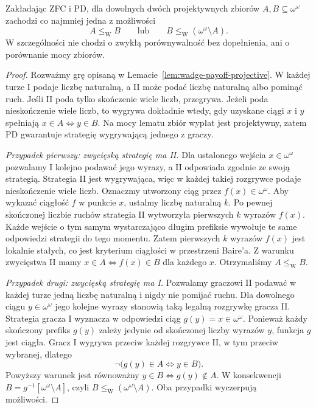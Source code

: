 \begin{twierdzenie}
\label{thm:pd-projective-wadge}
Zakładając ZFC i PD, dla dowolnych dwóch
projektywnych zbiorów $A,B\subseteq\omega^\omega$
zachodzi co najmniej jedna z możliwości
\[
 A\leq_{\mathrm W}B
 \qquad\text{lub}\qquad
 B\leq_{\mathrm W}(\omega^\omega\setminus A).
\]
W szczególności nie chodzi o zwykłą porównywalność
bez dopełnienia, ani o porównanie mocy zbiorów.
\end{twierdzenie}
\begin{proof}
Rozważmy grę opisaną w
Lemacie~\ref{lem:wadge-payoff-projective}.
W każdej turze I podaje liczbę naturalną, a II
może podać liczbę naturalną albo pominąć ruch.
Jeśli II poda tylko skończenie wiele liczb,
przegrywa. Jeżeli poda nieskończenie wiele liczb,
to wygrywa dokładnie wtedy, gdy uzyskane ciągi
$x$ i $y$ spełniają $x\in A\iff y\in B$.
Na mocy lematu zbiór wypłat jest projektywny,
zatem PD gwarantuje strategię wygrywającą jednego
z graczy.

\emph{Przypadek pierwszy: zwycięską strategię ma II.}
Dla ustalonego wejścia $x\in\omega^\omega$
pozwalamy I kolejno podawać jego wyrazy,
a II odpowiada zgodnie ze swoją strategią.
Strategia II jest wygrywająca, więc w każdej takiej
rozgrywce podaje nieskończenie wiele liczb.
Oznaczmy utworzony ciąg przez $f(x)\in\omega^\omega$.
Aby wykazać ciągłość $f$ w punkcie $x$, ustalmy
liczbę naturalną $k$. Po pewnej skończonej liczbie
ruchów strategia II wytworzyła pierwszych $k$
wyrazów $f(x)$. Każde wejście o tym samym
wystarczająco długim prefiksie wywołuje te same
odpowiedzi strategii do tego momentu. Zatem
pierwszych $k$ wyrazów $f(x)$ jest lokalnie
stałych, co jest kryterium ciągłości w przestrzeni
Baire'a. Z warunku zwycięstwa II mamy
$x\in A\iff f(x)\in B$ dla każdego $x$.
Otrzymaliśmy $A\leq_{\mathrm W}B$.

\emph{Przypadek drugi: zwycięską strategię ma I.}
Pozwalamy graczowi II podawać w każdej turze
jedną liczbę naturalną i nigdy nie pomijać ruchu.
Dla dowolnego ciągu $y\in\omega^\omega$ jego
kolejne wyrazy stanowią taką legalną rozgrywkę
gracza II. Strategia gracza I wyznacza w odpowiedzi
ciąg $g(y)=x\in\omega^\omega$. Ponieważ każdy
skończony prefiks $g(y)$ zależy jedynie od
skończonej liczby wyrazów $y$, funkcja $g$ jest
ciągła. Gracz I wygrywa przeciw każdej rozgrywce
II, w tym przeciw wybranej, dlatego
\[
 \neg\bigl(g(y)\in A\iff y\in B\bigr).
\]
Powyższy warunek jest równoważny
$y\in B\iff g(y)\notin A$. W konsekwencji
$B=g^{-1}[\omega^\omega\setminus A]$,
czyli $B\leq_{\mathrm W}(\omega^\omega\setminus A)$.
Oba przypadki wyczerpują możliwości.
\end{proof}

